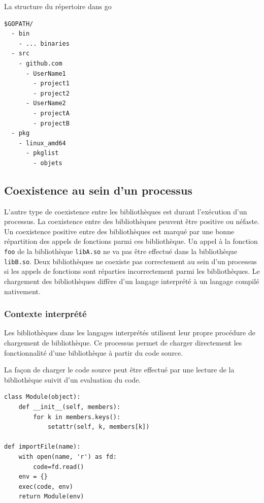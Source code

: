 La structure du répertoire dans go
\begin{verbatim}
$GOPATH/
  - bin
    - ... binaries
  - src
    - github.com
      - UserName1
        - project1
        - project2
      - UserName2
        - projectA
        - projectB
  - pkg
    - linux_amd64
      - pkglist
        - objets
\end{verbatim}



\subsection{Coexistence au sein d'un processus}
L'autre type de coexistence entre les bibliothèques est durant l'exécution d'un
processus.  La coexistence entre des bibliothèques peuvent être positive ou
néfaste.  Un coexistence positive entre des bibliothèques est marqué par une
bonne répartition des appels de fonctions parmi ces bibliothèque.  Un appel à
la fonction \verb|foo| de la bibliothèque \verb|libA.so| ne va pas être
effectué dans la bibliothèque \verb|libB.so|. Deux bibliothèques ne coexiste
pas correctement au sein d'un processus si les appels de fonctions sont
réparties incorrectement parmi les bibliothèques. Le chargement des bibliothèques
diffère d'un langage interprété à un langage compilé nativement.

\subsubsection{Contexte interprété}
Les bibliothèques dans les langages interprétés utilisent leur propre procédure
de chargement de bibliothèque. Ce processus permet de charger directement les
fonctionnalité d'une bibliothèque à partir du code source.

La façon de charger le code source peut être effectué par une lecture de la
bibliothèque suivit d'un evaluation du code.

\begin{verbatim}
class Module(object):
    def __init__(self, members):
        for k in members.keys():
            setattr(self, k, members[k])

def importFile(name):
    with open(name, 'r') as fd:
        code=fd.read()
    env = {}
    exec(code, env)
    return Module(env)

\end{verbatim}

